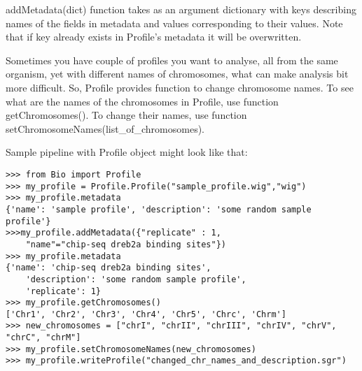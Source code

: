 \documentclass[a4paper,11pt,portrait]{article}
\begin{document}
addMetadata(dict) function takes as an argument dictionary
 with keys describing names of the fields in metadata
 and values corresponding to their values.
 Note that if key already exists in Profile's metadata
 it will be overwritten.

Sometimes you have couple of profiles you want to analyse,
 all from the same organism,
 yet with different names of chromosomes,
 what can make analysis bit more difficult.
 So, Profile provides function to change chromosome names.
 To see what are the names of the chromosomes in Profile,
 use function getChromosomes().
 To change their names, use function setChromosomeNames(list\_of\_chromosomes).

Sample pipeline with Profile object might look like that:

\begin{verbatim}
>>> from Bio import Profile
>>> my_profile = Profile.Profile("sample_profile.wig","wig")  
>>> my_profile.metadata 
{'name': 'sample profile', 'description': 'some random sample profile'}
>>>my_profile.addMetadata({"replicate" : 1,
	"name"="chip-seq dreb2a binding sites"})
>>> my_profile.metadata
{'name': 'chip-seq dreb2a binding sites',
	'description': 'some random sample profile',
	'replicate': 1}
>>> my_profile.getChromosomes()
['Chr1', 'Chr2', 'Chr3', 'Chr4', 'Chr5', 'Chrc', 'Chrm']
>>> new_chromosomes = ["chrI", "chrII", "chrIII", "chrIV", "chrV", "chrC", "chrM"] 
>>> my_profile.setChromosomeNames(new_chromosomes) 
>>> my_profile.writeProfile("changed_chr_names_and_description.sgr")
\end{verbatim}
\end{document}
